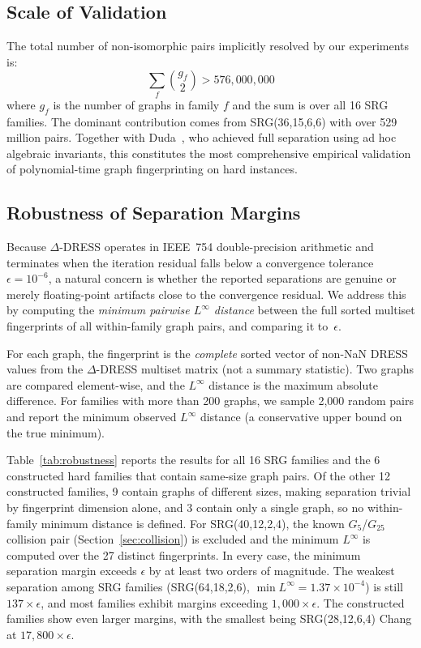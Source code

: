 \documentclass[11pt,a4paper]{article}
\begin{document}
\subsection{Scale of Validation}

The total number of non-isomorphic pairs implicitly resolved by our experiments is:
\[
\sum_{f} \binom{g_f}{2} > 576{,}000{,}000
\]
where $g_f$ is the number of graphs in family $f$ and the sum is over all 16 SRG families.
The dominant contribution comes from SRG(36,15,6,6) with over 529 million pairs.
Together with Duda~\cite{duda2024simple}, who achieved full separation using ad hoc algebraic invariants, this constitutes the most comprehensive empirical validation of polynomial-time graph fingerprinting on hard instances.


\subsection{Robustness of Separation Margins}
\label{sec:robustness}

Because $\Delta$-DRESS operates in IEEE~754 double-precision arithmetic and terminates when the iteration residual falls below a convergence tolerance $\epsilon = 10^{-6}$, a natural concern is whether the reported separations are genuine or merely floating-point artifacts close to the convergence residual.
We address this by computing the \emph{minimum pairwise $L^{\infty}$ distance} between the full sorted multiset fingerprints of all within-family graph pairs, and comparing it to~$\epsilon$.

For each graph, the fingerprint is the \emph{complete} sorted vector of non-NaN DRESS values from the $\Delta$-DRESS multiset matrix (not a summary statistic).
Two graphs are compared element-wise, and the $L^{\infty}$ distance is the maximum absolute difference.
For families with more than 200 graphs, we sample 2{,}000 random pairs and report the minimum observed $L^{\infty}$ distance (a conservative upper bound on the true minimum).

Table~\ref{tab:robustness} reports the results for all 16 SRG families and the 6 constructed hard families that contain same-size graph pairs.
Of the other 12 constructed families, 9 contain graphs of different sizes, making separation trivial by fingerprint dimension alone, and 3 contain only a single graph, so no within-family minimum distance is defined.
For SRG(40,12,2,4), the known $G_5$/$G_{25}$ collision pair (Section~\ref{sec:collision}) is excluded and the minimum $L^{\infty}$ is computed over the 27 distinct fingerprints.
In every case, the minimum separation margin exceeds $\epsilon$ by at least two orders of magnitude.
The weakest separation among SRG families (SRG(64,18,2,6), $\min L^{\infty} = 1.37 \times 10^{-4}$) is still $137 \times \epsilon$, and most families exhibit margins exceeding $1{,}000 \times \epsilon$.
The constructed families show even larger margins, with the smallest being SRG(28,12,6,4) Chang at $17{,}800 \times \epsilon$.
\end{document}
